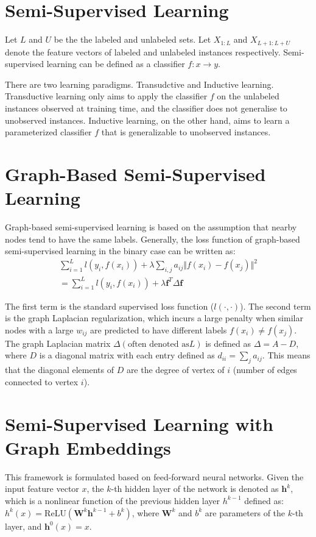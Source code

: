 \documentclass{article}
\begin{document}
\section{Semi-Supervised Learning}
Let $L$ and $U$ be the the labeled and unlabeled sets. Let $X_{1:L}$ and
$X_{L+1:L+U}$ denote the feature vectors of labeled and unlabeled instances
respectively. Semi-supervised learning can be defined as a classifier $f : x
\to y$.

There are two learning paradigms. Transudctive and Inductive learning.
Transductive learning only aims to apply the classifier $f$ on the unlabeled
instances observed at training time, and the classifier does not generalise to
unobserved instances. Inductive learning, on the other hand, aims to learn a
parameterized classifier $f$ that is generalizable to unobserved instances.

\section{Graph-Based Semi-Supervised Learning}
Graph-based semi-supervised learning is based on the assumption that nearby
nodes tend to have the same labels. Generally, the loss function of graph-based
semi-supervised learning in the binary case can be written as:
\begin{align}
  \sum_{i=1}^L l\left(y_i, f(x_i)\right) + \lambda \sum_{i,j} a_{ij} \Vert
  f(x_i) - f(x_j) \Vert ^2 \\
  = \sum_{i=1}^L l\left(y_i, f(x_i)\right) +
  \lambda \mathbf{f}^T \Delta \mathbf{f}
  \label{eq:1}
\end{align}

The first term is the standard supervised loss function ($l(\cdot,\cdot)$). The
second term is the graph Laplacian regularization, which incurs a large penalty
when similar nodes with a large $w_{ij}$ are predicted to have different labels
$f(x_i) \neq f(x_j)$. The graph Laplacian matrix $\Delta(\text{often denoted as
}L)$ is defined as $\Delta = A - D$, where $D$ is a diagonal matrix with each
entry defined as $d_{ii} = \sum_j a_{ij}$. This means that the diagonal
elements of $D$ are the degree of vertex of $i$ (number of edges connected to
vertex $i$).

\section{Semi-Supervised Learning with Graph Embeddings}
This framework is formulated based on feed-forward neural networks. Given the
input feature vector $x$, the $k$-th hidden layer of the network is denoted as
$\mathbf{h}^k$, which is a nonlinear function of the previous hidden layer
$h^{k-1}$ defined as: $h^k(x) = \text{ReLU}(\mathbf{W}^k \mathbf{h}^{k-1} +
b^k)$, where $\mathbf{W}^k$ and $b^k$ are parameters of the $k$-th layer, and
$\mathbf{h}^0(x) = x$.
\end{document}
